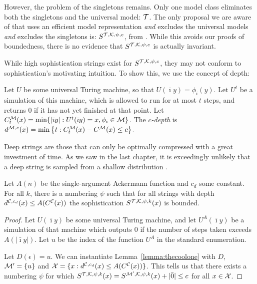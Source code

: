 
However, the problem of the singletons remains. Only one model class eliminates both the singletons and the universal model: ${\cal T}$. The only proposal we are aware of that uses an efficient model representation \emph{and} excludes the universal models \emph{and} excludes the singletons is: $S^{{\cal T},{\cal K},\psi,c}$, from \cite{vitanyi2004meaningful}. While this avoids our proofs of boundedness, there is no evidence that $S^{{\cal T},{\cal K},\psi, c}$ is actually invariant.


While high sophistication strings exist for $S^{{\cal T},{\cal K},\psi, c}$, they may not conform to sophistication's motivating intuition. To show this, we use the concept of depth:

\begin{definition}\belowdisplayskip=-12pt
Let $U$ be some universal Turing machine, so that $U(\bar\imath y) = \phi_i(y)$. Let $U^t$ be a simulation of this machine, which is allowed to run for at most $t$ steps, and returns $0$ if it has not yet finished at that point. Let $C^{\cal M}_t(x) = \min\{|\bar\imath y| : U^t(\bar\imath y) = x, \phi_i \in {\cal M}\}$. The \emph{$c$-depth} is $d^{{\cal M},c}(x) = \min \left\{t : C^{\cal M}_t(x) - C^{\cal M}(x) \leq c \right\}$.
\end{definition}
Deep strings are those that can only be optimally compressed with a great investment of time. As we saw in the last chapter, it is exceedingly unlikely that a deep string is sampled from a shallow distribution \cite{bennett1988logical}. 
 
\begin{theorem}
Let $A(n)$ be the single-argument Ackermann function and $c_d$ some constant. For all $k$, there is a numbering $\psi$ such that for all strings with depth $d^{{\cal C},c_d}(x) \leq A(C^{\cal C}(x))$ the sophistication $S^{{\cal T}, {\cal K}, \psi, k}(x)$ is bounded.\label{thm:depth}
\end{theorem}

\begin{proof}
Let $U(\bar\imath y)$ be some universal Turing machine, and let $U^A(\bar\imath y)$ be a simulation of that machine which outputs $0$ if the number of steps taken exceeds $A(|\bar\imath y|)$. Let $u$ be the index of the function $U^A$ in the standard enumeration.

Let $D(\epsilon) = u$. We can instantiate Lemma~\ref{lemma:thecoolone} with $D$, ${\cal M}' = \{u\}$ and ${\cal X} = \{x : d^{{\cal C},c_d}(x) \leq A(C^{\cal C}(x))\}$. This tells us that there exists a numbering $\psi$ for which $S^{{\cal T}, {\cal K},\psi,k}(x) = S^{{\cal M}', {\cal K}, \psi, k}(x) + |\bar0| \leq c$ for all $x \in {\cal X}$.
\end{proof}

